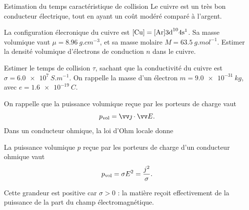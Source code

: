 \documentclass[12pt,fancy]{cours}%
\begin{document}
\begin{exemple}{Estimation du temps caractéristique de collision}
  Le cuivre est un très bon conducteur électrique, tout en ayant un coût modéré comparé à l'argent. 
\begin{quest}
  \item	La configuration élecronique du cuivre est $\rm{[Cu] = [Ar] 3d}^{10}{\rm 4s}^1$. Sa masse volumique vaut $\mu = \SI{8.96}{g.cm^{-3}}$, et sa masse molaire $M = \SI{63.5}{g.mol^{-1}}$. Estimer la densité volumique d'électrons de conduction $n$ dans le cuivre.
  \item Estimer le temps de collision $\tau$, sachant que la conductivité du cuivre est $\sigma = \SI{6.0e7}{S.m^{-1}}$. On rappelle la masse d'un électron $m=\SI{9.0e-31}{kg}$, avec $e=\SI{1.6e-19}{C}$.
\end{quest}

\end{exemple}



On rappelle que la puissance volumique reçue par les porteurs de charge vaut
\begin{equation}
p_{\rm vol} = \j \cdot \Vec{E}.
\end{equation}
Dans un conducteur ohmique, la loi d'Ohm locale donne
\begin{theorem}\label{form:}
La puissance volumique $p$ reçue par les porteurs de charge d'un conducteur ohmique vaut
$$
p_{\rm vol} = \sigma E^2 = \frac{j^2}{\sigma}.
$$
\end{theorem}
\noindent Cette grandeur est positive car $\sigma >0$ : la matière reçoit effectivement de la puissance de la part du champ électromagnétique.

\end{document}
